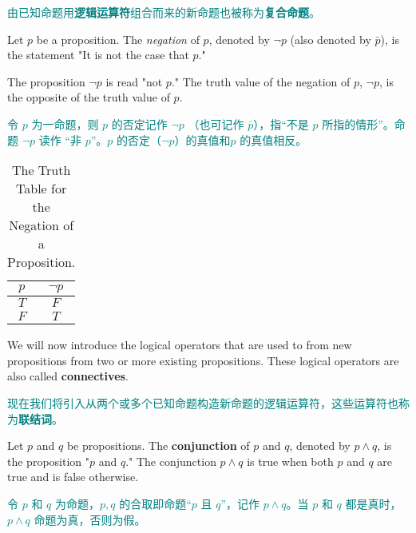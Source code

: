 \documentclass[12pt, a4paper]{article} %
\begin{document}
\textcolor{teal}{由已知命题用\textbf{逻辑运算符}组合而来的新命题也被称为\textbf{复合命题}。}

\begin{definition}
    Let $p$ be a proposition. The \textit{negation} of $p$, denoted by $\neg p$ (also denoted by $\bar{p}$), is the statement "It is not the case that $p$."

    The proposition $\neg p$ is read "not $p$." The truth value of the negation of $p$, $\neg p$, is the opposite of the truth value of $p$.
\end{definition}

\begin{theorem}
    \textcolor{teal}{令 $p$ 为一命题，则 $p$ 的否定记作 $\neg p$ （也可记作 $\bar{p}$），指“不是 $p$ 所指的情形”。命题 $\neg p$ 读作 “非 $p$”。$p$ 的否定（$\neg p$）的真值和$p$ 的真值相反。}
\end{theorem}

\begin{table}[H]
    \centering
    \caption{The Truth Table for the Negation of a Proposition.}
    \begin{tabular}{c|c}
        \toprule
        $p$ & $\neg p$ \\
        \midrule
        $T$ & $F$      \\
        $F$ & $T$      \\
        \bottomrule
    \end{tabular}%
    \label{tab:1}%
\end{table}%

We will now introduce the logical operators that are used to from new propositions from two or more existing propositions. These logical operators are also called \textbf{connectives}.

\textcolor{teal}{
    现在我们将引入从两个或多个已知命题构造新命题的逻辑运算符，这些运算符也称为\textbf{联结词}。
}

\begin{definition}
    Let $p$ and $q$ be propositions. The \textbf{conjunction} of $p$ and $q$, denoted by $p \wedge q$, is the proposition "$p$ and $q$." The conjunction $p \wedge q$ is true when both $p$ and $q$ are true and is false otherwise.
\end{definition}

\begin{theorem}
    \textcolor{teal}{
        令 $p$ 和 $q$ 为命题，$p, q$ 的合取即命题“$p$ 且 $q$”，记作 $p \wedge q$。当 $p$ 和 $q$ 都是真时，$p \wedge q$ 命题为真，否则为假。
    }
\end{theorem}
\end{document}
